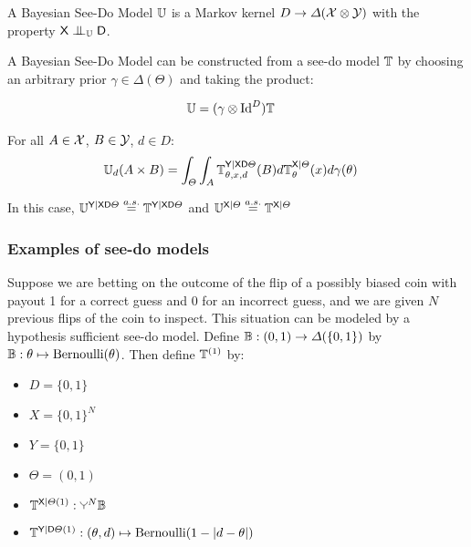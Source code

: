 \begin{definition}
A Bayesian See-Do Model $\mathbb{U}$ is a Markov kernel $D\to \Delta(\mathcal{X}\otimes\mathcal{Y})$ with the property $\RV{X}\CI_{\kernel{U}}\RV{D}$.

A Bayesian See-Do Model can be constructed from a see-do model $\mathbb{T}$ by choosing an arbitrary prior $\gamma\in \Delta(\Theta)$ and taking the product:

\begin{align}
    \mathbb{U} &= (\gamma\otimes \mathrm{Id}^D)\mathbb{T}
\end{align}

For all $A\in \mathcal{X}$, $B\in\mathcal{Y}$, $d\in D$:
\begin{align}
    \mathbb{U}_d(A\times B) &= \int_\Theta \int_A \mathbb{T}_{\theta,x,d}^{\mathsf{Y}|\mathsf{X}\mathsf{D}\Theta} (B) d\mathbb{T}_{\theta}^{\mathsf{X}|\Theta}(x) d\gamma(\theta)
\end{align}

In this case, $\mathbb{U}^{\mathsf{Y}|\mathsf{X}\mathsf{D}\Theta}\overset{a.s.}{=}\mathbb{T}^{\mathsf{Y}|\mathsf{X}\mathsf{D}\Theta}$ and $\mathbb{U}^{\mathsf{X}|\Theta}\overset{a.s.}{=}\mathbb{T}^{\mathsf{X}|\Theta}$


\end{definition}

\subsubsection{Examples of see-do models}

Suppose we are betting on the outcome of the flip of a possibly biased coin with payout 1 for a correct guess and 0 for an incorrect guess, and we are given $N$ previous flips of the coin to inspect. This situation can be modeled by a hypothesis sufficient see-do model. Define $\mathbb{B}:(0,1)\to \Delta(\{0,1\})$ by $\mathbb{B}:\theta\mapsto \mathrm{Bernoulli}(\theta)$. Then define $\mathbb{T}^{(1)}$ by:

\begin{itemize}
    \item $D=\{0,1\}$
    \item $X=\{0,1\}^N$
    \item $Y=\{0,1\}$
    \item $\Theta=(0,1)$
    \item $\kernel{T}^{\RV{X}|\Theta(1)}:\splitter{0.1}^N\kernel{B}$
    \item $\mathbb{T}^{\mathsf{Y}|\mathsf{D}\Theta(1)}:(\theta,d)\mapsto \mathrm{Bernoulli}(1-|d-\theta|)$
\end{itemize}

